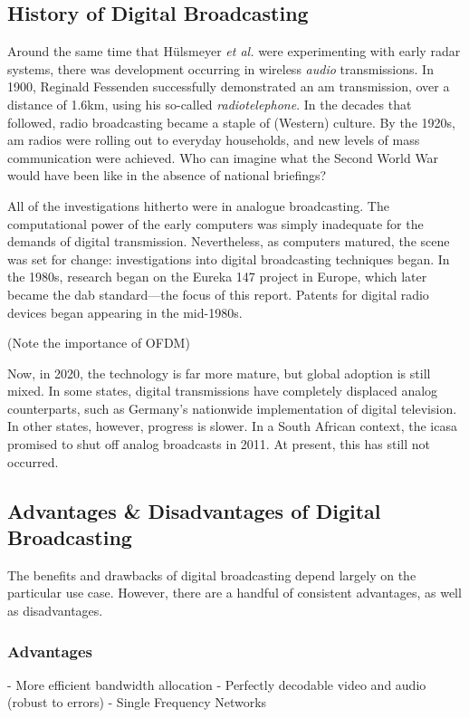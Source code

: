 \documentclass[class=report,11pt,crop=false]{standalone}
\begin{document}
\subsection{History of Digital Broadcasting}
Around the same time that H\"ulsmeyer \emph{et al.} were experimenting with early radar systems, there was development occurring in wireless \emph{audio} transmissions. In 1900, Reginald Fessenden successfully demonstrated an \gls{am} transmission, over a distance of 1.6km, using his so-called \emph{radiotelephone}. In the decades that followed, radio broadcasting became a staple of (Western) culture. By the 1920s, \gls{am} radios were rolling out to everyday households, and new levels of mass communication were achieved. Who can imagine what the Second World War would have been like in the absence of national briefings?

All of the investigations hitherto were in analogue broadcasting. The computational power of the early computers was simply inadequate for the demands of digital transmission. Nevertheless, as computers matured, the scene was set for change: investigations into digital broadcasting techniques began. In the 1980s, research began on the Eureka 147 project in Europe, which later became the \gls{dab} standard---the focus of this report. Patents for digital radio devices began appearing in the mid-1980s.

(Note the importance of OFDM)

Now, in 2020, the technology is far more mature, but global adoption is still mixed. In some states, digital transmissions have completely displaced analog counterparts, such as Germany's nationwide implementation of digital television. In other states, however, progress is slower. In a South African context, the \gls{icasa} promised to shut off analog broadcasts in 2011. At present, this has still not occurred.

\subsection{Advantages \& Disadvantages of Digital Broadcasting}
The benefits and drawbacks of digital broadcasting depend largely on the particular use case. However, there are a handful of consistent advantages, as well as disadvantages.

\subsubsection{Advantages}
- More efficient bandwidth allocation
- Perfectly decodable video and audio (robust to errors)
- Single Frequency Networks
\end{document}
